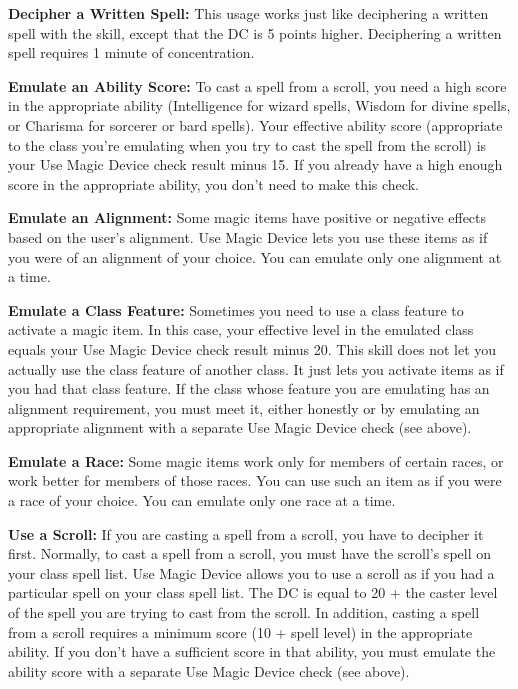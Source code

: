 \textbf{Decipher a Written Spell:} This usage works just like deciphering a written spell with the  skill, except that the DC is 5 points higher. Deciphering a written spell requires 1 minute of concentration.

\textbf{Emulate an Ability Score:} To cast a spell from a scroll, you need a high score in the appropriate ability (Intelligence for wizard spells, Wisdom for divine spells, or Charisma for sorcerer or bard spells). Your effective ability score (appropriate to the class you're emulating when you try to cast the spell from the scroll) is your Use Magic Device check result minus 15. If you already have a high enough score in the appropriate ability, you don't need to make this check.

\textbf{Emulate an Alignment:} Some magic items have positive or negative effects based on the user's alignment. Use Magic Device lets you use these items as if you were of an alignment of your choice. You can emulate only one alignment at a time.

\textbf{Emulate a Class Feature:} Sometimes you need to use a class feature to activate a magic item. In this case, your effective level in the emulated class equals your Use Magic Device check result minus 20.  This skill does not let you actually use the class feature of another class. It just lets you activate items as if you had that class feature. If the class whose feature you are emulating has an alignment requirement, you must meet it, either honestly or by emulating an appropriate alignment with a separate Use Magic Device check (see above).

\textbf{Emulate a Race:} Some magic items work only for members of certain races, or work better for members of those races. You can use such an item as if you were a race of your choice. You can emulate only one race at a time.

\textbf{Use a Scroll:} If you are casting a spell from a scroll, you have to decipher it first. Normally, to cast a spell from a scroll, you must have the scroll's spell on your class spell list. Use Magic Device allows you to use a scroll as if you had a particular spell on your class spell list. The DC is equal to 20 + the caster level of the spell you are trying to cast from the scroll. In addition, casting a spell from a scroll requires a minimum score (10 + spell level) in the appropriate ability. If you don't have a sufficient score in that ability, you must emulate the ability score with a separate Use Magic Device check (see above).

